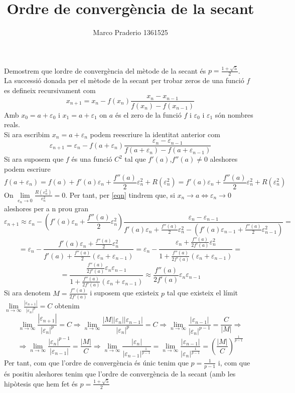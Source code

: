 \documentclass[a4paper,10pt]{article}
\title{Ordre de convergència de la secant}
\author{Marco Praderio 1361525}
\date{}
\renewcommand{\*}{\cdot}
\newcommand{\e}{\varepsilon}
\begin{document}
\maketitle
Demostrem que lordre de convergència del mètode de la secant és $p=\frac{1+\sqrt{5}}{2}$.\\
La successió donada per el mètode de la secant per trobar zeros de una funció $f$ es defineix recursivament com
$$x_{n+1}=x_n-f(x_n)\frac{x_n-x_{n-1}}{f(x_n)-f(x_{n-1})}$$
Amb $x_0=a+\e_0$ i $x_1=a+\e_1$ on $a$ és el zero de la funció $f$ i $\e_0$ i $\e_1$ són nombres reals.\\
Si ara escribim $x_n=a+\e_n$ podem reescriure la identitat anterior com
\begin{equation}
\label{eqn}
\e_{n+1}=\e_n-f(a+\e_n)\frac{\e_n-\e_{n-1}}{f(a+\e_n)-f(a+\e_{n-1})}
\end{equation}
Si ara suposem que $f$ és una funció $C^2$ tal que $f'(a)$,$f''(a)\not=0$ aleshores podem escriure
\begin{equation*}
f(a+\e_n)=f(a)+f'(a)\e_n+\frac{f''(a)}{2}\e_n^2+R(\e_n^2)=f'(a)\e_n+\frac{f''(a)}{2}\e_n^2+R(\e_n^2)
\end{equation*}
On $\lim\limits_{e_n\to0}\frac{R(\e_n^2)}{e_n^2}=0$. Per tant, per \ref{eqn} tindrem que, si $x_n\to a \Leftrightarrow \e_n\to 0$ aleshores per a n prou gran
\begin{equation*}
 \e_{n+1}\approx\e_n-(f'(a)\e_n+\frac{f''(a)}{2}\e_n^2)\frac{\e_n-\e_{n-1}}{f'(a)\e_n+\frac{f''(a)}{2}\e_n^2-(f'(a)\e_{n-1}+
 \frac{f''(a)}{2}\e_{n-1}^2)}=
\end{equation*}
\begin{equation*}
 =\e_n-\frac{f'(a)\e_n+\frac{f''(a)}{2}\e_n^2}{f'(a)+\frac{f''(a)}{2}(\e_n+\e_{n-1})}=\e_n-\frac{\e_n+\frac{f''(a)}{2f'(a)}\e_n^2}{1+\frac{f''(a)}{2f'(a)}(\e_n+\e_{n-1})}=
\end{equation*}
\begin{equation*}
 =\frac{\frac{f''(a)}{2f'(a)}\e_n\e_{n-1}}{1+\frac{f''(a)}{2f'(a)}(\e_n+\e_{n-1})}\approx \frac{f''(a)}{2f'(a)}\e_n\e_{n-1}
\end{equation*}
Si ara denotem $M=\frac{f''(a)}{2f'(a)}$ i suposem que existeix $p$ tal que existeix el límit $\lim\limits_{n\to\infty}\frac{|\e_{n+1}|}{|\e_n|^p}=C$
obtenim
\begin{equation*}
\lim\limits_{n\to\infty}\frac{|\e_{n+1}|}{|\e_n|^p}=C \Rightarrow \lim\limits_{n\to\infty}\frac{|M||\e_n||\e_{n-1}|}{|\e_n|^p}=C
 \Rightarrow \lim\limits_{n\to\infty}\frac{|\e_{n-1}|}{|\e_n|^{p-1}}=\frac{C}{|M|} \Rightarrow
\end{equation*}
\begin{equation*}
 \Rightarrow \lim\limits_{n\to\infty}\frac{|\e_n|^{p-1}}{|\e_{n-1}|}=\frac{|M|}{C} \Rightarrow \lim\limits_{n\to\infty}\frac{|\e_n|}{|\e_{n-1}|^{\frac{1}{p-1}}}=
 \lim\limits_{n\to\infty}\frac{|\e_{n-1}|}{|\e_n|^{\frac{1}{p-1}}}=
 \left(\frac{|M|}{C}\right)^{\frac{1}{p-1}}
\end{equation*}
Per tant, com que l'ordre de convergència és únic tenim que $p=\frac{1}{p-1}$ i, com que és positiu aleshores tenim que l'ordre de convergència de la secant
(amb les hipòtesis que hem fet és $p=\frac{1+\sqrt{5}}{2}$
\end{document}
